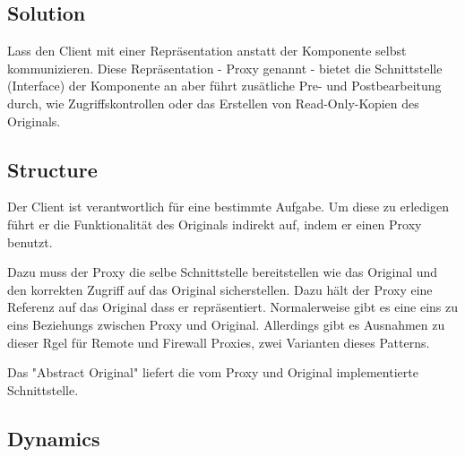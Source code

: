 \subsection*{Solution}


Lass den Client mit einer Repräsentation anstatt der Komponente selbst kommunizieren. Diese Repräsentation - Proxy genannt - bietet die Schnittstelle (Interface) der Komponente an aber führt zusätliche Pre- und Postbearbeitung durch, wie Zugriffskontrollen oder das Erstellen von Read-Only-Kopien des Originals.

\subsection*{Structure}

Der Client ist verantwortlich für eine bestimmte Aufgabe. Um diese zu erledigen führt er die Funktionalität des Originals indirekt auf, indem er einen Proxy benutzt.

Dazu muss der Proxy die selbe Schnittstelle bereitstellen wie das Original und den korrekten Zugriff auf das Original sicherstellen. Dazu hält der Proxy eine Referenz auf das Original dass er repräsentiert. Normalerweise gibt es eine eins zu eins Beziehungs zwischen Proxy und Original. Allerdings gibt es Ausnahmen zu dieser Rgel für Remote und Firewall Proxies, zwei Varianten dieses Patterns.

Das "Abstract Original" liefert die vom Proxy und Original implementierte Schnittstelle.

\subsection*{Dynamics}


